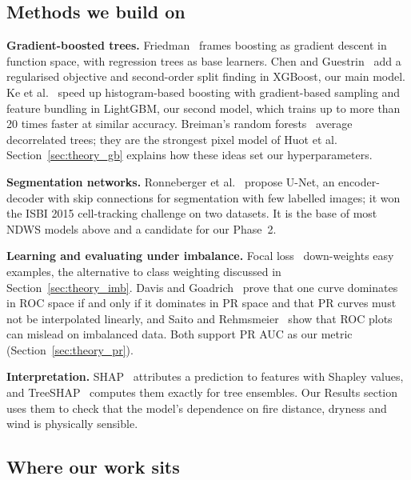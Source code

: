 \subsection{Methods we build on}

\textbf{Gradient-boosted trees.} Friedman~\cite{friedman2001} frames boosting as gradient descent in
function space, with regression trees as base learners. Chen and Guestrin~\cite{chen2016} add a
regularised objective and second-order split finding in XGBoost, our main model. Ke et
al.~\cite{ke2017} speed up histogram-based boosting with gradient-based sampling and feature bundling in
LightGBM, our second model, which trains up to more than 20 times faster at similar accuracy. Breiman's
random forests~\cite{breiman2001} average decorrelated trees; they are the strongest pixel model of Huot et
al. Section~\ref{sec:theory_gb} explains how these ideas set our hyperparameters.

\textbf{Segmentation networks.} Ronneberger et al.~\cite{ronneberger2015} propose U-Net, an
encoder-decoder with skip connections for segmentation with few labelled images; it won the ISBI 2015
cell-tracking challenge on two datasets. It is the base of most NDWS models above and a candidate for our
Phase~2.

\textbf{Learning and evaluating under imbalance.} Focal loss~\cite{lin2017} down-weights easy examples,
the alternative to class weighting discussed in Section~\ref{sec:theory_imb}. Davis and
Goadrich~\cite{davis2006} prove that one curve dominates in ROC space if and only if it dominates in PR
space and that PR curves must not be interpolated linearly, and Saito and Rehmsmeier~\cite{saito2015}
show that ROC plots can mislead on imbalanced data. Both support PR AUC as our metric
(Section~\ref{sec:theory_pr}).

\textbf{Interpretation.} SHAP~\cite{lundberg2017} attributes a prediction to features with Shapley
values, and TreeSHAP~\cite{lundberg2020} computes them exactly for tree ensembles. Our Results section uses
them to check that the model's dependence on fire distance, dryness and wind is physically sensible.

\subsection{Where our work sits}
\label{sec:rw_position}

